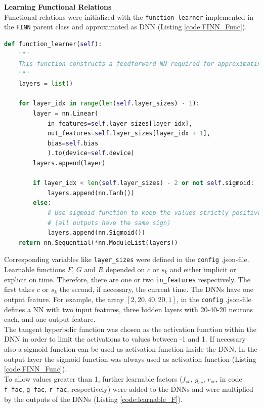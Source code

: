\textbf{Learning Functional Relations}
\\
Functional relations were initialized with the \texttt{function\_learner} implemented in the \texttt{FINN} parent class and approximated as DNN (Listing \ref{code:FINN_Func}).
\begin{lstlisting}[float, language=python, caption={Usage of a DNN to learn functional relations.}, label=code:FINN_Func]
def function_learner(self):
    """
    This function constructs a feedforward NN required for approximating a functional relation.
    """
    layers = list()
    
    for layer_idx in range(len(self.layer_sizes) - 1):
        layer = nn.Linear(
            in_features=self.layer_sizes[layer_idx],
            out_features=self.layer_sizes[layer_idx + 1],
            bias=self.bias
            ).to(device=self.device)
        layers.append(layer)
    
        if layer_idx < len(self.layer_sizes) - 2 or not self.sigmoid:
            layers.append(nn.Tanh())
        else:
            # Use sigmoid function to keep the values strictly positive
            # (all outputs have the same sign)
            layers.append(nn.Sigmoid())
    return nn.Sequential(*nn.ModuleList(layers))
\end{lstlisting}
Corresponding variables like \texttt{layer\_sizes} were defined in the \texttt{config} .json-file. Learnable functions $F$, $G$ and $R$ depended on $c$ or $s_k$ and either implicit or explicit on time. Therefore, there are one or two \texttt{in\_features} respectively. The first takes $c$ or $s_k$ the second, if necessary, the current time. The DNNs have one output feature. For example, the array $[2, 20, 40, 20, 1]$, in the \texttt{config} .json-file defines a NN with two input features, three hidden layers with 20-40-20 neurons each, and one output feature.\\
The tangent hyperbolic function was chosen as the activation function within the DNN in order to limit the activations to values between -1 and 1. If necessary also a sigmoid function can be used as activation function inside the DNN. In the output layer the sigmoid function was always used as activation function (Listing \ref{code:FINN_Func}).\\
To allow values greater than 1, further learnable factors ($f_{sc}$, $g_{sc}$, $r_{sc}$, in code \texttt{f\_fac}, \texttt{g\_fac}, \texttt{r\_fac}, respectively) were added to the DNNs and were multiplied by the outputs of the DNNs (Listing \ref{code:learnable_F}).
